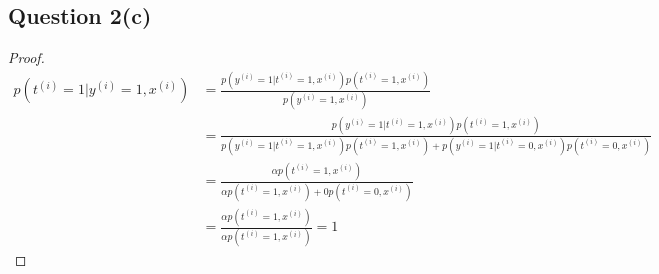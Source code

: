\documentclass[11pt]{article}
\newcommand{\upi}[0]{^{(i)}}
\begin{document}
	\subsection{Question 2(c)}
	\begin{proof}
		\begin{align}
			p(t\upi=1 | y\upi=1, x\upi) &= \frac{p(y\upi=1|t\upi=1,x\upi)p(t\upi=1,x\upi)}{p(y\upi=1,x\upi)} \\
			&= \frac{
				p(y\upi=1|t\upi=1,x\upi)p(t\upi=1,x\upi)
			}{
				p(y\upi=1|t\upi=1,x\upi)p(t\upi=1,x\upi)
				+ p(y\upi=1|t\upi=0,x\upi)p(t\upi=0,x\upi)
			} \\
			&= \frac{
				\alpha p(t\upi=1,x\upi)
			}{
				\alpha p(t\upi=1,x\upi) + 0p(t\upi=0,x\upi)
			} \\
			&= \frac{
				\alpha p(t\upi=1,x\upi)
			}{
				\alpha p(t\upi=1,x\upi)
			}=1
		\end{align}
	\end{proof}
\end{document}

